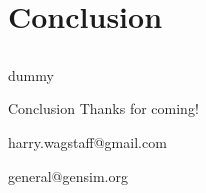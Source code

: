 \section{Conclusion}
\subsection{}

\begin{frame}{dummy}\end{frame}

\begin{frame}{Conclusion}
	\centering
	Thanks for coming!
	
	\bigskip
	
	harry.wagstaff@gmail.com
	
	general@gensim.org
\end{frame}
